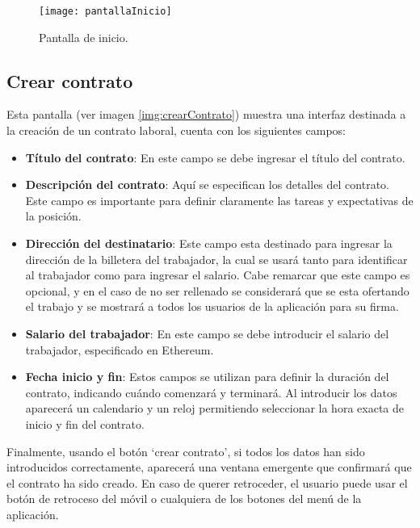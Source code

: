 \begin{figure}[h]
	\label{img:pantallaInicio}
	\centering
	\texttt{[image: pantallaInicio]}
	\caption[Pantalla inicio]{Pantalla de inicio.}
\end{figure}


\subsection{Crear contrato}
\label{sec:CrearContrato}

Esta pantalla (ver imagen \ref{img:crearContrato}) muestra una interfaz destinada a la creación de un contrato laboral, cuenta con los siguientes campos:

\begin{itemize}

\item \textbf{Título del contrato}: En este campo se debe ingresar el título del contrato.

\item \textbf{Descripción del contrato}: Aquí se especifican los detalles del contrato. Este campo es importante para definir claramente las tareas y expectativas de la posición.

\item \textbf{Dirección del destinatario}: Este campo esta destinado para ingresar la dirección de la billetera del trabajador, la cual se usará tanto para identificar al trabajador como para ingresar el salario.
Cabe remarcar que este campo es opcional, y en el caso de no ser rellenado se considerará que se esta ofertando el trabajo y se mostrará a todos los usuarios de la aplicación para su firma.

\item \textbf{Salario del trabajador}: En este campo se debe introducir el salario del trabajador, especificado en Ethereum.

\item \textbf{Fecha inicio y fin}: Estos campos se utilizan para definir la duración del contrato, indicando cuándo comenzará y terminará. Al introducir los datos aparecerá un calendario y un reloj permitiendo seleccionar la hora exacta de inicio y fin del contrato.

\end{itemize}

Finalmente, usando el botón `crear contrato', si todos los datos han sido introducidos correctamente, aparecerá una ventana emergente que confirmará que el contrato ha sido creado.
En caso de querer retroceder, el usuario puede usar el botón de retroceso del móvil o cualquiera de los botones del menú de la aplicación.

